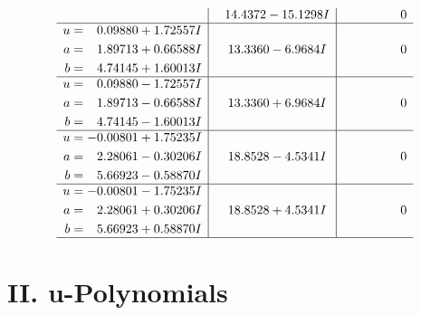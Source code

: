 \documentclass[1p]{elsarticle_modified}
\theoremstyle{definition}
\begin{document}
$$\begin{array}{c|c|c}
 & \phantom{-}14.4372 - 15.1298 I & \phantom{-0.000000 } 0 \\ \hline\begin{aligned}
u &= \phantom{-}0.09880 + 1.72557 I \\
a &= \phantom{-}1.89713 + 0.66588 I \\
b &= \phantom{-}4.74145 + 1.60013 I\end{aligned}
 & \phantom{-}13.3360 - 6.9684 I & \phantom{-0.000000 } 0 \\ \hline\begin{aligned}
u &= \phantom{-}0.09880 - 1.72557 I \\
a &= \phantom{-}1.89713 - 0.66588 I \\
b &= \phantom{-}4.74145 - 1.60013 I\end{aligned}
 & \phantom{-}13.3360 + 6.9684 I & \phantom{-0.000000 } 0 \\ \hline\begin{aligned}
u &= -0.00801 + 1.75235 I \\
a &= \phantom{-}2.28061 - 0.30206 I \\
b &= \phantom{-}5.66923 - 0.58870 I\end{aligned}
 & \phantom{-}18.8528 - 4.5341 I & \phantom{-0.000000 } 0 \\ \hline\begin{aligned}
u &= -0.00801 - 1.75235 I \\
a &= \phantom{-}2.28061 + 0.30206 I \\
b &= \phantom{-}5.66923 + 0.58870 I\end{aligned}
 & \phantom{-}18.8528 + 4.5341 I & \phantom{-0.000000 } 0\\
 \hline 
 \end{array}$$\newpage
\newpage\renewcommand{\arraystretch}{1}
\centering \section*{ II. u-Polynomials}
\end{document}
